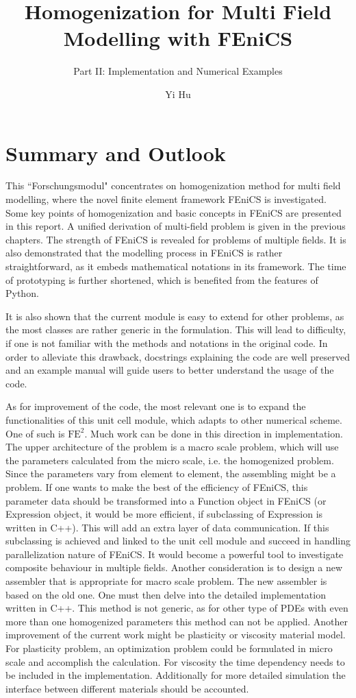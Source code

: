 \documentclass[10pt,a4paper]{scrreprt}
\author{Yi Hu}
\title{Homogenization for Multi Field Modelling with FEniCS}
\subtitle{Part II: Implementation and Numerical Examples}
\begin{document}
\chapter{Summary and Outlook}
This ``Forschungsmodul" concentrates on homogenization method for multi field modelling, where the novel finite element framework FEniCS is investigated. Some key points of homogenization and basic concepts in FEniCS are presented in this report. A unified derivation of multi-field problem is given in the previous chapters. The strength of FEniCS is revealed for problems of multiple fields. It is also demonstrated that the modelling process in FEniCS is rather straightforward, as it embeds mathematical notations in its framework. The time of prototyping is further shortened, which is  benefited from the features of Python.

It is also shown that the current module is easy to extend for other problems, as the most classes are rather generic in the formulation. This will lead to difficulty, if one is not familiar with the methods and notations in the original code. In order to alleviate this drawback, docstrings explaining the code are well preserved and an example manual will guide users to better understand the usage of the code.

As for improvement of the code, the most relevant one is to expand the functionalities of this unit cell module, which adapts to other numerical scheme. One of such is $\text{FE}^{2}$. Much work can be done in this direction in implementation. The upper architecture of the problem is a macro scale problem, which will use the parameters calculated from the micro scale, i.e. the homogenized problem. Since the parameters vary from element to element, the assembling might be a problem. If one wants to make the best of the efficiency of FEniCS, this parameter data should be transformed into a Function object in FEniCS (or Expression object, it would be more efficient, if subclassing of Expression is written in C++). This will add an extra layer of data communication. If this subclassing is achieved and linked to the unit cell module and succeed in handling parallelization nature of FEniCS. It would become a powerful tool to investigate composite behaviour in multiple fields. Another consideration is to design a new assembler that is appropriate for macro scale problem. The new assembler is based on the old one. One must then delve into the detailed implementation written in C++. This method is not generic, as for other type of PDEs with even more than one homogenized parameters this method can not be applied. Another improvement of the current work might be plasticity or viscosity material model. For plasticity problem, an optimization problem could be formulated in micro scale and accomplish the calculation. For viscosity the time dependency needs to be included in the implementation. Additionally for more detailed simulation the interface between different materials should be accounted.
\end{document}

